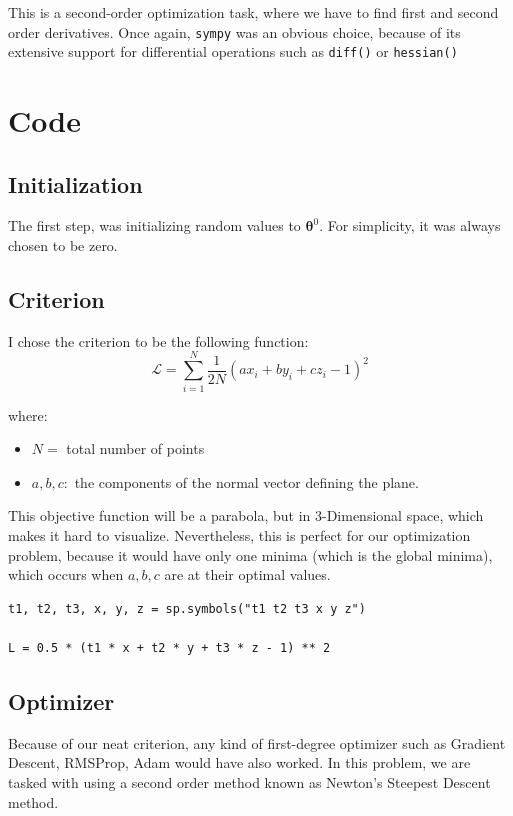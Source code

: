 \documentclass{report}
\begin{document}
This is a second-order optimization task, where we have to find first and second order derivatives. Once again, \texttt{sympy} was an obvious choice, because of its extensive support for differential operations such as \texttt{diff()} or \texttt{hessian()}
\section{Code}

\subsection{Initialization}
The first step, was initializing random values to $\boldsymbol{\theta}^0$. For simplicity, it was always chosen to be zero.

\subsection{Criterion}
I chose the criterion to be the following function:
$$\mathcal{L} = \sum_{i = 1}^{N}{\frac{1}{2N}{(a x_i + b y_i + c z_i - 1)^2}}$$

where:
\begin{itemize}
    \item $N = $ total number of points
    \item $a, b, c: $ the components of the normal vector defining the plane.
\end{itemize}

This objective function will be a parabola, but in 3-Dimensional space, which makes it hard to visualize. Nevertheless, this is perfect for our optimization problem, because it would have only one minima (which is the global minima), which occurs when $a, b, c$ are at their optimal values.

\begin{lstlisting}[caption={Declaring the criterion as an expression}]
t1, t2, t3, x, y, z = sp.symbols("t1 t2 t3 x y z")

L = 0.5 * (t1 * x + t2 * y + t3 * z - 1) ** 2
\end{lstlisting}
\subsection{Optimizer}

Because of our neat criterion, any kind of first-degree optimizer such as Gradient Descent, RMSProp, Adam would have also worked. In this problem, we are tasked with using a second order method known as Newton's Steepest Descent method.
\newline
\end{document}
